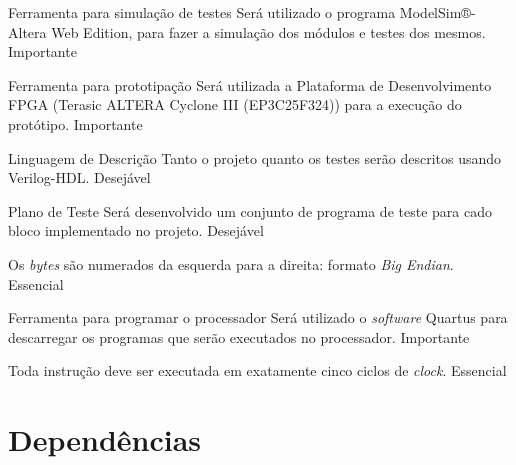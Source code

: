 \documentclass{article}
\begin{document}
  \begin{nonfunctional}

    \requirement
    {Ferramenta para simulação de testes}
    {Será utilizado o programa ModelSim®-Altera Web Edition, para fazer a simulação dos módulos e testes dos mesmos.}
    {Importante}

    \requirement
    {Ferramenta para prototipação}
    {Será utilizada a Plataforma de Desenvolvimento FPGA  (Terasic ALTERA Cyclone III (EP3C25F324)) para a execução do protótipo.}
    {Importante}

    \requirement
    {Linguagem de Descrição}
    {Tanto o projeto quanto os testes serão descritos usando Verilog-HDL.}
    {Desejável}

    \requirement
    {Plano de Teste}
    {Será desenvolvido um conjunto de programa de teste para cado bloco implementado no projeto. }
    {Desejável}

    {Os \textit{bytes} são numerados da esquerda para a direita: formato \textit{Big Endian}.}
    {Essencial}

    \requirement
    {Ferramenta para programar o processador}
    {Será utilizado o \textit{software} Quartus para descarregar os programas que serão executados no processador.}
    {Importante}


    {Toda instrução deve ser executada em exatamente cinco ciclos de \textit{clock}.}
    {Essencial}

  \end{nonfunctional}

\section{Dependências}

  \begin{dependencies}
\end{dependencies}

% 
% 
\end{document}
